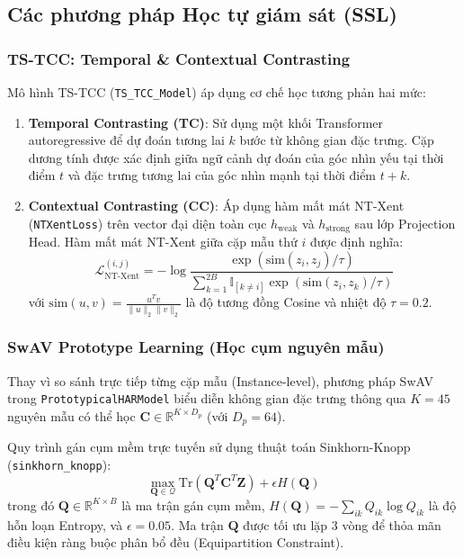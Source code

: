 \subsection{Các phương pháp Học tự giám sát (SSL)}

\subsubsection{TS-TCC: Temporal \& Contextual Contrasting}
Mô hình TS-TCC (\texttt{TS\_TCC\_Model}) áp dụng cơ chế học tương phản hai mức:
\begin{enumerate}
    \item \textbf{Temporal Contrasting (TC)}: Sử dụng một khối Transformer autoregressive để dự đoán tương lai $k$ bước từ không gian đặc trưng. Cặp dương tính được xác định giữa ngữ cảnh dự đoán của góc nhìn yếu tại thời điểm $t$ và đặc trưng tương lai của góc nhìn mạnh tại thời điểm $t+k$.
    \item \textbf{Contextual Contrasting (CC)}: Áp dụng hàm mất mát NT-Xent (\texttt{NTXentLoss}) trên vector đại diện toàn cục $h_{\text{weak}}$ và $h_{\text{strong}}$ sau lớp Projection Head. Hàm mất mát NT-Xent giữa cặp mẫu thứ $i$ được định nghĩa:
    \begin{equation}
        \mathcal{L}_{\text{NT-Xent}}^{(i, j)} = -\log \frac{\exp(\text{sim}(z_i, z_j) / \tau)}{\sum_{k=1}^{2B} \mathbb{I}_{[k \neq i]} \exp(\text{sim}(z_i, z_k) / \tau)}
    \end{equation}
    với $\text{sim}(u, v) = \frac{u^T v}{\|u\|_2 \|v\|_2}$ là độ tương đồng Cosine và nhiệt độ $\tau = 0.2$.
\end{enumerate}

\subsubsection{SwAV Prototype Learning (Học cụm nguyên mẫu)}
Thay vì so sánh trực tiếp từng cặp mẫu (Instance-level), phương pháp SwAV trong \texttt{PrototypicalHARModel} biểu diễn không gian đặc trưng thông qua $K=45$ nguyên mẫu có thể học $\mathbf{C} \in \mathbb{R}^{K \times D_p}$ (với $D_p = 64$).

Quy trình gán cụm mềm trực tuyến sử dụng thuật toán Sinkhorn-Knopp (\texttt{sinkhorn\_knopp}):
\begin{equation}
    \max_{\mathbf{Q} \in \mathcal{Q}} \text{Tr}(\mathbf{Q}^T \mathbf{C}^T \mathbf{Z}) + \epsilon H(\mathbf{Q})
\end{equation}
trong đó $\mathbf{Q} \in \mathbb{R}^{K \times B}$ là ma trận gán cụm mềm, $H(\mathbf{Q}) = -\sum_{ik} Q_{ik} \log Q_{ik}$ là độ hỗn loạn Entropy, và $\epsilon = 0.05$. Ma trận $\mathbf{Q}$ được tối ưu lặp $3$ vòng để thỏa mãn điều kiện ràng buộc phân bổ đều (Equipartition Constraint).

